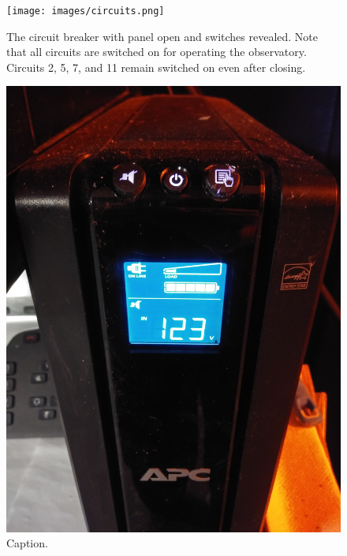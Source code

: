 \documentclass{article}
\begin{document}
	\begin{figure}[htbp!]
		\centering
		\texttt{[image: images/circuits.png]}
		\caption{The circuit breaker with panel open and switches revealed. Note that all circuits are switched on for operating the observatory. Circuits 2, 5, 7, and 11 remain switched on even after closing.}
		\label{fig:circuits}
	\end{figure}

	\begin{figure}[htbp!]
		\centering
		\includegraphics[angle=270, scale=0.05]{images/ups_backup.png}
		\caption{Caption.}
		\label{fig:ups}
	\end{figure}
\end{document}
